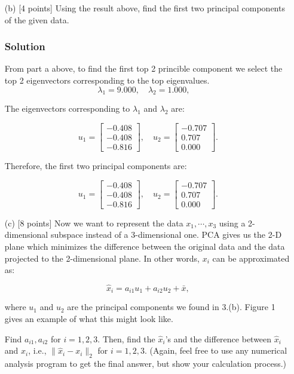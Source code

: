 \documentclass{article}
\begin{document}
\begin{enumerate}
    \item[(b)] [4 points] Using the result above, find the first two principal components of the given data.
    \subsubsection*{Solution}
    From part a above, to find the first top 2 princible component we select the top 2 eigenvectors corresponding to the top eigenvalues. 
    \[
    \lambda_1 = 9.000, \quad \lambda_2 = 1.000, \quad 
    \]

    The eigenvectors corresponding to \(\lambda_1\) and \(\lambda_2\) are:

    \[
    u_1 = \begin{bmatrix} -0.408 \\ -0.408 \\ -0.816 \end{bmatrix}, \quad
    u_2 = \begin{bmatrix} -0.707 \\ 0.707 \\ 0.000 \end{bmatrix}.
    \]

    Therefore, the first two principal components are:

    \[
    u_1 = \begin{bmatrix} -0.408 \\ -0.408 \\ -0.816 \end{bmatrix}, \quad
    u_2 = \begin{bmatrix} -0.707 \\ 0.707 \\ 0.000 \end{bmatrix}.
    \]


    \item[(c)] [8 points] Now we want to represent the data $x_1, \cdots, x_3$ using a 2-dimensional subspace instead of a 3-dimensional one. PCA gives us the 2-D plane which minimizes the difference between the original data and the data projected to the 2-dimensional plane. In other words, $x_i$ can be approximated as:


\[
    \hat{x}_i = a_{i1}u_1 + a_{i2}u_2 + \bar{x},
    \]


    where $u_1$ and $u_2$ are the principal components we found in 3.(b). Figure 1 gives an example of what this might look like.

    Find $a_{i1}, a_{i2}$ for $i = 1, 2, 3$. Then, find the $\hat{x}_i$'s and the difference between $\hat{x}_i$ and $x_i$, i.e., $\|\hat{x}_i - x_i\|_2$ for $i = 1, 2, 3$. (Again, feel free to use any numerical analysis program to get the final answer, but show your calculation process.)


\end{enumerate}
\end{document}
